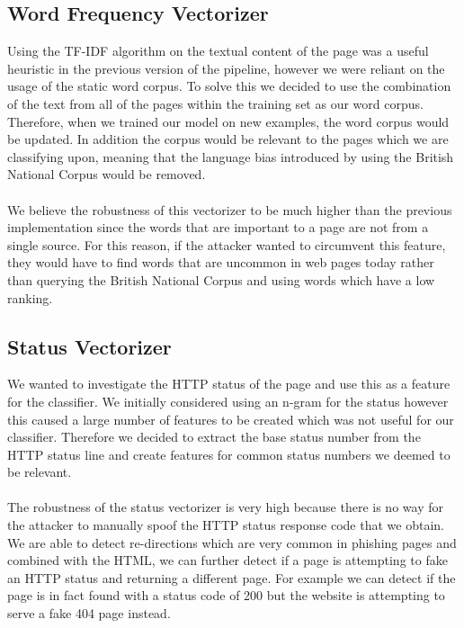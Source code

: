\documentclass[12pt,twoside]{report}
\begin{document}
\subsection{Word Frequency Vectorizer}\label{wordfrequencyvectorizer}
Using the TF-IDF algorithm on the textual content of the page was a useful heuristic in the previous version of the pipeline, however we were reliant on the usage of the static word corpus. To solve this we decided to use the combination of the text from all of the pages within the training set as our word corpus. Therefore, when we trained our model on new examples, the word corpus would be updated. In addition the corpus would be relevant to the pages which we are classifying upon, meaning that the language bias introduced by using the British National Corpus would be removed.
\\\\
We believe the robustness of this vectorizer to be much higher than the previous implementation since the words that are important to a page are not from a single source. For this reason, if the attacker wanted to circumvent this feature, they would have to find words that are uncommon in web pages today rather than querying the British National Corpus and using words which have a low ranking.
\subsection{Status Vectorizer}
We wanted to investigate the HTTP status of the page and use this as a feature for the classifier. We initially considered using an n-gram for the status however this caused a large number of features to be created which was not useful for our classifier. Therefore we decided to extract the base status number from the HTTP status line and create features for common status numbers we deemed to be relevant.
\\\\
The robustness of the status vectorizer is very high because there is no way for the attacker to manually spoof the HTTP status response code that we obtain. We are able to detect re-directions which are very common in phishing pages and combined with the HTML, we can further detect if a page is attempting to fake an HTTP status and returning a different page. For example we can detect if the page is in fact found with a status code of 200 but the website is attempting to serve a fake 404 page instead.
\end{document}
